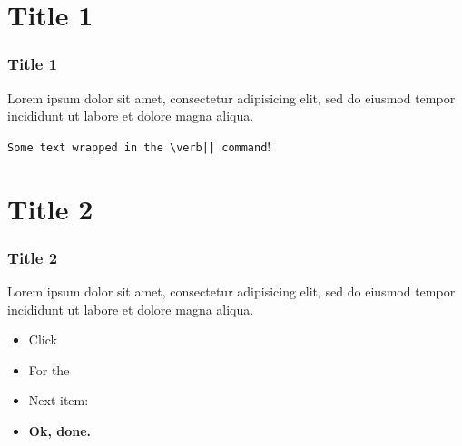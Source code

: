 



\begin{frame}

  \titlepage

\end{frame}

\section{Title 1}

\begin{frame}[fragile]

  \frametitle{Title 1}

  Lorem ipsum dolor sit amet, consectetur adipisicing elit, sed do
  eiusmod tempor incididunt ut labore et dolore magna aliqua.

  \verb!Some text wrapped in the \verb|| command!!

\end{frame}

\section{Title 2}

\begin{frame}

  \frametitle{Title 2}

  Lorem ipsum dolor sit amet, consectetur adipisicing elit, sed do
  eiusmod tempor incididunt ut labore et dolore magna aliqua.

  \pause

  \begin{itemize}
    \item Click \pause
    \item For the \pause
    \item Next item: \pause
    \item \textbf{Ok, done.}
  \end{itemize}

\end{frame}


